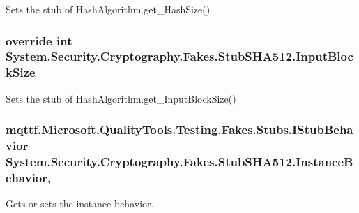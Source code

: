 Sets the stub of Hash\-Algorithm.\-get\-\_\-\-Hash\-Size()

\hypertarget{class_system_1_1_security_1_1_cryptography_1_1_fakes_1_1_stub_s_h_a512_a524606f437de3fef9351b254d78bc391}{
\subsubsection[{Input\-Block\-Size}]{\setlength{\rightskip}{0pt plus 5cm}override int System.\-Security.\-Cryptography.\-Fakes.\-Stub\-S\-H\-A512.\-Input\-Block\-Size\hspace{0.3cm}{\ttfamily [get]}}}\label{class_system_1_1_security_1_1_cryptography_1_1_fakes_1_1_stub_s_h_a512_a524606f437de3fef9351b254d78bc391}


Sets the stub of Hash\-Algorithm.\-get\-\_\-\-Input\-Block\-Size()

\hypertarget{class_system_1_1_security_1_1_cryptography_1_1_fakes_1_1_stub_s_h_a512_a27bf8d3e5898aca13a1c6c18eff83a34}{
\subsubsection[{Instance\-Behavior}]{\setlength{\rightskip}{0pt plus 5cm}mqttf.\-Microsoft.\-Quality\-Tools.\-Testing.\-Fakes.\-Stubs.\-I\-Stub\-Behavior System.\-Security.\-Cryptography.\-Fakes.\-Stub\-S\-H\-A512.\-Instance\-Behavior\hspace{0.3cm}{\ttfamily [get]}, {\ttfamily [set]}}}\label{class_system_1_1_security_1_1_cryptography_1_1_fakes_1_1_stub_s_h_a512_a27bf8d3e5898aca13a1c6c18eff83a34}


Gets or sets the instance behavior.

